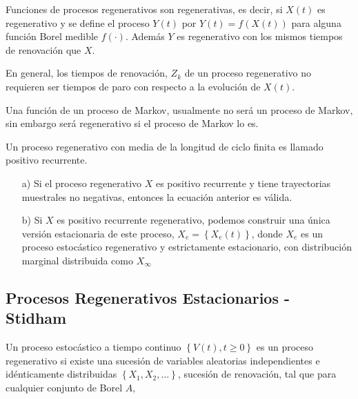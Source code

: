 \begin{Note}
Funciones de procesos regenerativos son regenerativas, es decir, si $X\left(t\right)$ es regenerativo y se define el proceso $Y\left(t\right)$ por $Y\left(t\right)=f\left(X\left(t\right)\right)$ para alguna funci\'on Borel medible $f\left(\cdot\right)$. Adem\'as $Y$ es regenerativo con los mismos tiempos de renovaci\'on que $X$. 

En general, los tiempos de renovaci\'on, $Z_{k}$ de un proceso regenerativo no requieren ser tiempos de paro con respecto a la evoluci\'on de $X\left(t\right)$.
\end{Note} 

\begin{Note}
Una funci\'on de un proceso de Markov, usualmente no ser\'a un proceso de Markov, sin embargo ser\'a regenerativo si el proceso de Markov lo es.
\end{Note}

 
\begin{Note}
Un proceso regenerativo con media de la longitud de ciclo finita es llamado positivo recurrente.
\end{Note}


\begin{Note}
\begin{itemize}
\item[a)] Si el proceso regenerativo $X$ es positivo recurrente y tiene trayectorias muestrales no negativas, entonces la ecuaci\'on anterior es v\'alida.
\item[b)] Si $X$ es positivo recurrente regenerativo, podemos construir una \'unica versi\'on estacionaria de este proceso, $X_{e}=\left\{X_{e}\left(t\right)\right\}$, donde $X_{e}$ es un proceso estoc\'astico regenerativo y estrictamente estacionario, con distribuci\'on marginal distribuida como $X_{\infty}$
\end{itemize}
\end{Note}


\subsection{Procesos Regenerativos Estacionarios - Stidham \cite{Stidham}}


Un proceso estoc\'astico a tiempo continuo $\left\{V\left(t\right),t\geq0\right\}$ es un proceso regenerativo si existe una sucesi\'on de variables aleatorias independientes e id\'enticamente distribuidas $\left\{X_{1},X_{2},\ldots\right\}$, sucesi\'on de renovaci\'on, tal que para cualquier conjunto de Borel $A$, 


